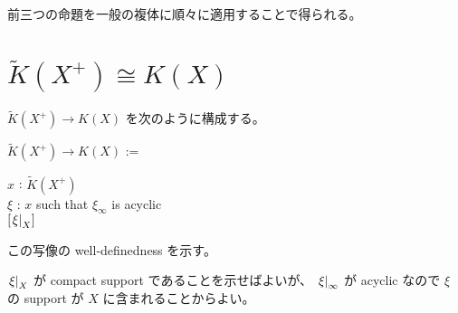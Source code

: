 \documentclass[dvipdfmx]{jsarticle}
\begin{document}
\begin{Proof}
\itemprof
  前三つの命題を一般の複体に順々に適用することで得られる。
\end{Proof}

\newpage
\section{\(\tilde{K}(X^+) \cong K(X)\)}
\(\tilde{K}(X^+) \to K(X)\) を次のように構成する。

\begin{Definition}
  \itemdefi \Define \(\tilde{K}(X^+) \to K(X)\) :=
  \begin{indentblock}
    \For \(x\) : \(\tilde{K}(X^+)\) \\
    \Take \(\xi\) : \(x\) such that \(\xi_{\infty}\) is acyclic \\
    \Return \([\left. {\xi} \right| _{X}]\)
  \end{indentblock}
\end{Definition}

この写像の well-definedness を示す。

\begin{Proof}
\itemprof
  \(\left. {\xi} \right| _{X}\) が compact support であることを示せばよいが、 \(\left. {\xi} \right| _{\infty}\) が acyclic なので \(\xi\) の support が \(X\) に含まれることからよい。
\end{Proof}
\end{document}
